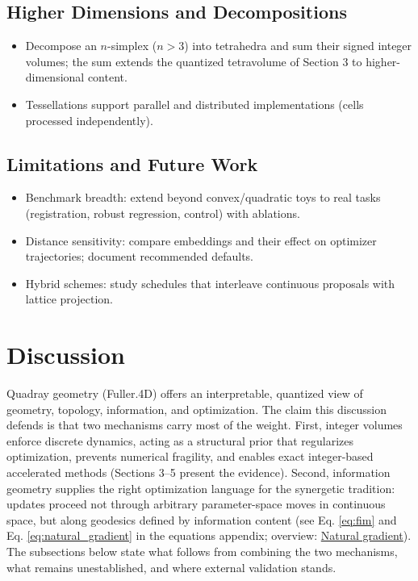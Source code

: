 \documentclass[
  10pt,
]{article}
\providecommand{\tightlist}{%
  \setlength{\itemsep}{0pt}\setlength{\parskip}{0pt}}
\begin{document}
\subsection{Higher Dimensions and
Decompositions}\label{higher-dimensions-and-decompositions}

\begin{itemize}
\tightlist
\item
  Decompose an \(n\)-simplex (\(n > 3\)) into tetrahedra and sum their
  signed integer volumes; the sum extends the quantized tetravolume of
  Section 3 to higher-dimensional content.
\item
  Tessellations support parallel and distributed implementations (cells
  processed independently).
\end{itemize}

\subsection{Limitations and Future
Work}\label{limitations-and-future-work}

\begin{itemize}
\tightlist
\item
  Benchmark breadth: extend beyond convex/quadratic toys to real tasks
  (registration, robust regression, control) with ablations.
\item
  Distance sensitivity: compare embeddings and their effect on optimizer
  trajectories; document recommended defaults.
\item
  Hybrid schemes: study schedules that interleave continuous proposals
  with lattice projection.
\end{itemize}

\newpage

\section{Discussion}\label{discussion}

Quadray geometry (Fuller.4D) offers an interpretable, quantized view of
geometry, topology, information, and optimization. The claim this
discussion defends is that two mechanisms carry most of the weight.
First, integer volumes enforce discrete dynamics, acting as a structural
prior that regularizes optimization, prevents numerical fragility, and
enables exact integer-based accelerated methods (Sections 3--5 present
the evidence). Second, information geometry supplies the right
optimization language for the synergetic tradition: updates proceed not
through arbitrary parameter-space moves in continuous space, but along
geodesics defined by information content (see Eq. \eqref{eq:fim} and Eq.
\eqref{eq:natural_gradient} in the equations appendix; overview:
\href{https://en.wikipedia.org/wiki/Natural_gradient}{Natural
gradient}). The subsections below state what follows from combining the
two mechanisms, what remains unestablished, and where external
validation stands.
\end{document}
